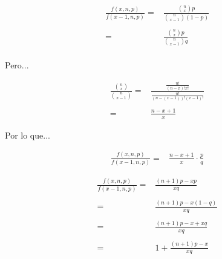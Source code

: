 \documentclass{beamer}
\begin{document}
\begin{frame}{}
  \begin{equation}
    \begin{array}{rr}
    \frac{f(x,n,p)}{f(x-1,n,p)} = & \frac{\binom{n}{x} p}{\binom{n}{x-1} (1-p)} \\
    \\
                                = & \frac{\binom{n}{x} p}{\binom{n}{x-1} q} \\
    \end{array}
  \end{equation}

  Pero...
  
  \begin{equation}
    \begin{array}{rr}
    \frac{\binom{n}{x}}{\binom{n}{x-1}} = & \frac{\frac{n!}{(n-x)!x!}}{\frac{n!}{(n-(x-1))!(x-1)!}} \\
    \\
                                        = & \frac{n-x+1}{x}
    \end{array}
  \end{equation}

  Por lo que...

  \begin{equation}
    \begin{array}{rr}
    \frac{f(x,n,p)}{f(x-1,n,p)} = & \frac{n-x+1}{x} \cdot \frac{p}{q}
    \end{array}
  \end{equation}

\end{frame}

\begin{frame}{}
  \begin{equation}
    \begin{array}{rr}
    \frac{f(x,n,p)}{f(x-1,n,p)} = & \frac{(n+1)p - xp}{xq} \\
    \\
                                = & \frac{(n+1)p - x(1-q)}{xq} \\
    \\
                                = & \frac{(n+1)p - x + xq}{xq} \\
    \\
                                = & 1 + \frac{(n+1)p - x}{xq} \\
    \end{array}
    \label{eq:poissonGral}
  \end{equation}

\end{frame}
\end{document}
